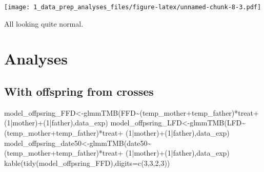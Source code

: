 \documentclass[
]{article}
\newenvironment{Shaded}{\begin{snugshade}}{\end{snugshade}}
\newcommand{\AttributeTok}[1]{\textcolor[rgb]{0.77,0.63,0.00}{#1}}
\newcommand{\DecValTok}[1]{\textcolor[rgb]{0.00,0.00,0.81}{#1}}
\newcommand{\FunctionTok}[1]{\textcolor[rgb]{0.00,0.00,0.00}{#1}}
\newcommand{\NormalTok}[1]{#1}
\newcommand{\OtherTok}[1]{\textcolor[rgb]{0.56,0.35,0.01}{#1}}
\newcommand{\SpecialCharTok}[1]{\textcolor[rgb]{0.00,0.00,0.00}{#1}}
\begin{document}
\texttt{[image: 1\_data\_prep\_analyses\_files/figure-latex/unnamed-chunk-8-3.pdf]}

All looking quite normal.

\hypertarget{analyses}{%
\section{Analyses}\label{analyses}}

\hypertarget{with-offspring-from-crosses}{%
\subsection{With offspring from
crosses}\label{with-offspring-from-crosses}}

\begin{Shaded}
\begin{Highlighting}[]
\NormalTok{model\_offpsring\_FFD}\OtherTok{\textless{}{-}}\FunctionTok{glmmTMB}\NormalTok{(FFD}\SpecialCharTok{\textasciitilde{}}\NormalTok{(temp\_mother}\SpecialCharTok{+}\NormalTok{temp\_father)}\SpecialCharTok{*}\NormalTok{treat}\SpecialCharTok{+}
\NormalTok{                               (}\DecValTok{1}\SpecialCharTok{|}\NormalTok{mother)}\SpecialCharTok{+}\NormalTok{(}\DecValTok{1}\SpecialCharTok{|}\NormalTok{father),data\_exp)}
\NormalTok{model\_offpsring\_LFD}\OtherTok{\textless{}{-}}\FunctionTok{glmmTMB}\NormalTok{(LFD}\SpecialCharTok{\textasciitilde{}}\NormalTok{(temp\_mother}\SpecialCharTok{+}\NormalTok{temp\_father)}\SpecialCharTok{*}\NormalTok{treat}\SpecialCharTok{+}
\NormalTok{                               (}\DecValTok{1}\SpecialCharTok{|}\NormalTok{mother)}\SpecialCharTok{+}\NormalTok{(}\DecValTok{1}\SpecialCharTok{|}\NormalTok{father),data\_exp)}
\NormalTok{model\_offpsring\_date50}\OtherTok{\textless{}{-}}\FunctionTok{glmmTMB}\NormalTok{(date50}\SpecialCharTok{\textasciitilde{}}\NormalTok{(temp\_mother}\SpecialCharTok{+}\NormalTok{temp\_father)}\SpecialCharTok{*}\NormalTok{treat}\SpecialCharTok{+}
\NormalTok{                               (}\DecValTok{1}\SpecialCharTok{|}\NormalTok{mother)}\SpecialCharTok{+}\NormalTok{(}\DecValTok{1}\SpecialCharTok{|}\NormalTok{father),data\_exp)}
\FunctionTok{kable}\NormalTok{(}\FunctionTok{tidy}\NormalTok{(model\_offpsring\_FFD),}\AttributeTok{digits=}\FunctionTok{c}\NormalTok{(}\DecValTok{3}\NormalTok{,}\DecValTok{3}\NormalTok{,}\DecValTok{2}\NormalTok{,}\DecValTok{3}\NormalTok{))}
\end{Highlighting}
\end{Shaded}
\end{document}
